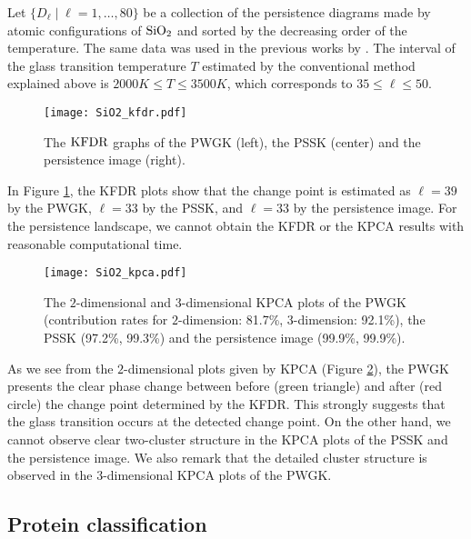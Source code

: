 \documentclass{article}
\newcommand{\KFDR}{{\rm KFDR}}
\begin{document}
Let $\{D_\ell\mid \ell=1,\dots,80\}$ be a collection of the persistence diagrams made by atomic configurations of ${\rm SiO}_2$ and sorted by the decreasing order of the temperature. The same data was used in the previous works by \cite{HNHEMN16,NHHEN15}. The interval of the glass transition temperature $T$ estimated by the conventional method explained above is $2000K\leq T\leq 3500K$, which corresponds to $35\leq \ell \leq 50$. 

\begin{figure}[htbp]
\begin{center}
\texttt{[image: SiO2\_kfdr.pdf]}
\end{center}
\vspace{-3mm}
\caption{The $\KFDR$ graphs of the PWGK (left), the PSSK (center) and the persistence image (right).}
\label{fig:glass_KFDR}
\end{figure}
In Figure \ref{fig:glass_KFDR}, the KFDR plots show that the change point is estimated as $\ell=39$ by the PWGK, $\ell=33$ by the PSSK, and $\ell=33$   by the persistence image. For the persistence landscape, we cannot obtain the KFDR or the KPCA results with reasonable computational time.

\begin{figure}[htbp]
\begin{center}
\texttt{[image: SiO2\_kpca.pdf]}
\end{center}
\vspace{-3mm}
\caption{The $2$-dimensional and $3$-dimensional KPCA plots of the PWGK (contribution rates for $2$-dimension: 81.7\%, $3$-dimension: 92.1\%), the PSSK (97.2\%, 99.3\%) and the persistence image (99.9\%, 99.9\%).}
\label{fig:glass_kpca}
\end{figure}
As we see from the $2$-dimensional plots given by KPCA (Figure \ref{fig:glass_kpca}), the PWGK presents the clear phase change between before (green triangle) and after (red circle) the change point determined by the KFDR.
This strongly suggests that the glass transition occurs at the detected change point.
On the other hand, we cannot observe clear two-cluster structure in the KPCA plots of the PSSK and the persistence image.  
We also remark that the detailed cluster structure is observed in the $3$-dimensional KPCA plots of the PWGK.

\subsection{Protein classification}
\label{subsec:Protein}
\end{document}
